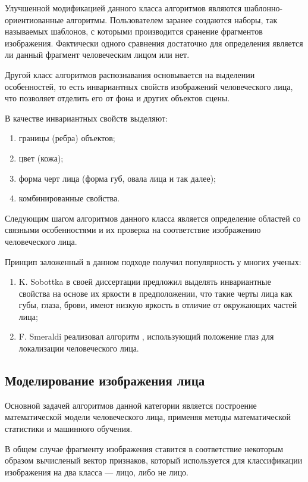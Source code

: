 Улучшенной модификацией данного класса алгоритмов являются
шаблонно-ориентиованные алгоритмы. Пользователем заранее создаются наборы, так
называемых шаблонов, с которыми производится сранение фрагментов изображения.
Фактически одного сравнения достаточно для определения является ли данный
фрагмент человеческим лицом или нет.

Другой класс алгоритмов распознавания основывается на выделении особенностей,
то есть инвариантных свойств изображений человеческого лица, что позволяет
отделить его от фона и других объектов сцены.

В качестве инвариантных свойств выделяют:
\begin{enumerate}
 \item границы (ребра) объектов;
  \item цвет (кожа);
  \item форма черт лица (форма губ, овала лица и так далее);
  \item комбинированные свойства.
\end{enumerate}

Следующим шагом алгоритмов данного класса является определение областей со
связными особенностями и их проверка на соответствие изображению человеческого
лица. 

Принцип заложенный в данном подходе получил популярность у многих ученых:
\begin{enumerate}
 \item K. Sobottka в своей диссертации \cite{K_Sobottka} предложил выделять
инвариантные свойства на основе их яркости в предположении, что такие черты
лица как губы, глаза, брови, имеют низкую яркость в отличие от окружающих
частей лица;
  \item F. Smeraldi реализовал алгоритм \cite{F_Smeraldi}, использующий
положение глаз для локализации человеческого лица. 
\end{enumerate}


\subsection{Моделирование изображения лица}
Основной задачей алгоритмов данной категории является построение математической
модели человеческого лица, применяя методы математической статистики и
машинного обучения.

В общем случае фрагменту изображения ставится в соответствие некоторым образом
вычисленый вектор признаков, который используется для классификации изображения
на два класса --- лицо, либо не лицо.

